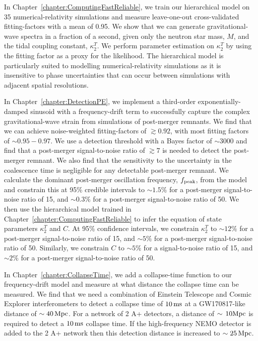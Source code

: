 \documentclass[../Thesis.tex]{subfiles}
\begin{document}
    In Chapter~\ref{chapter:ComputingFastReliable}, we train our hierarchical model on 35 numerical-relativity simulations and measure leave-one-out cross-validated fitting-factors with a mean of 0.95. 
    We show that we can generate gravitational-wave spectra in a fraction of a second, given only the neutron star mass, $M$, and the tidal coupling constant, $\kappa_2^T$.
    We perform parameter estimation on $\kappa_2^T$ by using the fitting factor as a proxy for the likelihood.
    The hierarchical model is particularly suited to modelling numerical-relativity simulations as it is insensitive to phase uncertainties that can occur between simulations with adjacent spatial resolutions.

    
    In Chapter~\ref{chapter:DetectionPE},  we implement a third-order exponentially-damped sinusoid with a frequency-drift term to successfully capture the complex gravitational-wave strain from simulations of post-merger remnants.
    We find that we can achieve noise-weighted fitting-factors of $\gtrsim 0.92$, with most fitting factors of $\sim 0.95 - 0.97$.
    We use a detection threshold with a Bayes factor of $\sim 3000$ and find that a post-merger signal-to-noise ratio of $\gtrsim 7$ is needed to detect the post-merger remnant.
    We also find that the sensitivity to the uncertainty in the coalescence time is negligible for any detectable post-merger remnant.
    We calculate the dominant post-merger oscillation frequency, $f_{\mathrm{peak}}$, from the model and constrain this at 95\% credible intervals to $\sim 1.5\%$ for a post-merger signal-to-noise ratio of 15, and $\sim 0.3\%$ for a post-merger signal-to-noise ratio of 50. 
    We then use the hierarchical model trained in Chapter~\ref{chapter:ComputingFastReliable} to infer the equation of state parameters $\kappa_2^T$ and $C$.
    At 95\% confidence intervals, we constrain $\kappa_2^T$ to $\sim 12\%$ for a post-merger signal-to-noise ratio of 15, and $\sim 5\%$ for a post-merger signal-to-noise ratio of 50.
    Similarly, we constrain $C$ to $\sim 5\%$ for a signal-to-noise ratio of 15, and $\sim 2\%$ for a post-merger signal-to-noise ratio of 50.

    In Chapter~\ref{chapter:CollapseTime},   we add a collapse-time function to our frequency-drift model and measure at what distance the collapse time can be measured.
    We find that we need a combination of Einstein Telescope and Cosmic Explorer interferometers to detect a collapse time of $10\,\mathrm{ms}$ at a GW170817-like distance of $\sim 40\,\mathrm{Mpc}$.
    For a network of 2 A+ detectors, a distance of $\sim\,10\mathrm{Mpc}$ is required to detect a $10\,\mathrm{ms}$ collapse time.
    If the high-frequency NEMO detector is added to the 2 A+ network then this detection distance is increased to $\sim 25\,\mathrm{Mpc}$. \par
    
\end{document}
